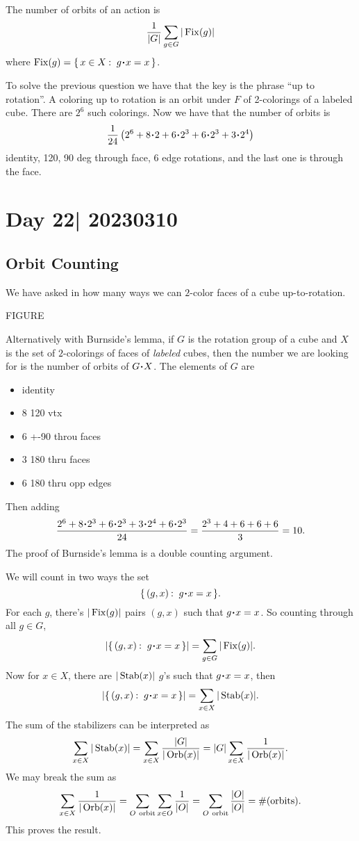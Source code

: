 \documentclass[12pt]{memoir}
\begin{document}
\begin{Lem}
    The number of orbits of an action is 
    $$\frac{1}{|G|}\sum_{g\in G}|\operatorname{Fix}(g)|$$
    where $\Fix(g)=\set{x\in X\:\ g\.x=x}$.
\end{Lem}

To solve the previous question we have that the key is the phrase ``up to rotation''. A coloring up to rotation is an orbit under $F$ of 2-colorings of a labeled cube. There are $2^6$ such colorings. Now we have that the number of orbits is 
$$\frac{1}{24}\left(2^6+8\.2+6\.2^3+6\.2^3+3\.2^4\right)$$
identity, 120, 90 deg through face, 6 edge rotations, and the last one is through the face.

\section{Day 22| 20230310}

\subsection{Orbit Counting}

We have asked in how many ways we can $2$-color faces of a cube up-to-rotation.
\begin{center}
    FIGURE
\end{center}
Alternatively with Burnside's lemma, if $G$ is the rotation group of a cube and $X$ is the set of $2$-colorings of faces of \emph{labeled} cubes, then the number we are looking for is the number of orbits of $G\. X$. The elements of $G$ are 
\begin{itemize}
    \item identity 
    \item 8 120 vtx 
    \item 6 +-90 throu faces
    \item 3 180 thru faces
    \item 6 180 thru opp edges
\end{itemize}
Then adding 
$$\frac{2^6+8\.2^3+6\.2^3+3\.2^4+6\.2^3}{24}=\frac{2^3+4+6+6+6}{3}=10.$$
The proof of Burnside's lemma is a double counting argument.
\begin{ptcbp}
    We will count in two ways the set 
    $$\set{(g,x)\:\ g\.x=x}.$$
    For each $g$, there's $|\operatorname{Fix}(g)|$ pairs $(g,x)$ such that $g\.x=x$. So counting through all $g\in G$, 
    $$|\set{(g,x)\:\ g\.x=x}|=\sum_{g\in G}|\Fix(g)|.$$
    Now for $x\in X$, there are $|\operatorname{Stab}(x)|$ $g$'s such that $g\.x=x$, then 
    $$|\set{(g,x)\:\ g\.x=x}|=\sum_{x\in X}|\Stab(x)|.$$
    The sum of the stabilizers can be interpreted as
    $$\sum_{x\in X}|\operatorname{Stab}(x)|=\sum_{x\in X}\frac{|G|}{|\operatorname{Orb}(x)|}=|G|\sum_{x\in X}\frac{1}{|\operatorname{Orb}(x)|}.$$
    We may break the sum as 
    $$\sum_{x\in X}\frac{1}{|\Orb(x)|}=\sum_{O\ \text{orbit}}\sum_{x\in O}\frac{1}{|O|}=\sum_{O\ \text{orbit}}\frac{|O|}{|O|}=\#(\text{orbits}).$$
    This proves the result.
\end{ptcbp}
\end{document}
